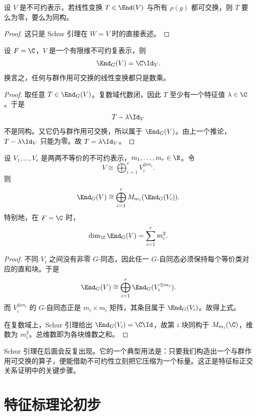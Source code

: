 \begin{corollary}
设 $V$ 是不可约表示，若线性变换 $T\in \End(V)$ 与所有 $\rho(g)$ 都可交换，则 $T$ 要么为零，要么为同构。
\end{corollary}

\begin{proof}
这只是 Schur 引理在 $W=V$ 时的直接表述。
\end{proof}

\begin{corollary}
设 $F=\C$，$V$ 是一个有限维不可约复表示，则
\[
\End_G(V)=\C\Id_V.
\]
换言之，任何与群作用可交换的线性变换都只是数乘。
\end{corollary}

\begin{proof}
取任意 $T\in \End_G(V)$。复数域代数闭，因此 $T$ 至少有一个特征值 $\lambda\in \C$。于是
\[
T-\lambda \Id_V
\]
不是同构。又它仍与群作用可交换，所以属于 $\End_G(V)$。由上一个推论，$T-\lambda\Id_V$ 只能为零。故 $T=\lambda\Id_V$。
\end{proof}

\begin{proposition}
设 $V_1,\dots,V_r$ 是两两不等价的不可约表示，$m_1,\dots,m_r\in \N$。令
\[
V\cong \bigoplus_{i=1}^r V_i^{\oplus m_i}.
\]
则
\[
\End_G(V)\cong \bigoplus_{i=1}^r M_{m_i}(\End_G(V_i)).
\]
特别地，在 $F=\C$ 时，
\[
\dim_{\C}\End_G(V)=\sum_{i=1}^r m_i^2.
\]
\end{proposition}

\begin{proof}
不同 $V_i$ 之间没有非零 $G$-同态，因此任一 $G$-自同态必须保持每个等价类对应的直和块。于是
\[
\End_G(V)\cong \bigoplus_{i=1}^r \End_G(V_i^{\oplus m_i}).
\]
而 $V_i^{\oplus m_i}$ 的 $G$-自同态正是 $m_i\times m_i$ 矩阵，其条目属于 $\End_G(V_i)$。故得上式。

在复数域上，Schur 引理给出 $\End_G(V_i)=\C\Id$，故第 $i$ 块同构于 $M_{m_i}(\C)$，维数为 $m_i^2$。总维数即为各块维数之和。
\end{proof}

\begin{remark}
Schur 引理在后面会反复出现。它的一个典型用法是：只要我们构造出一个与群作用可交换的算子，便能借助不可约性立刻把它压缩为一个标量。这正是特征标正交关系证明中的关键步骤。
\end{remark}

\section{特征标理论初步}

